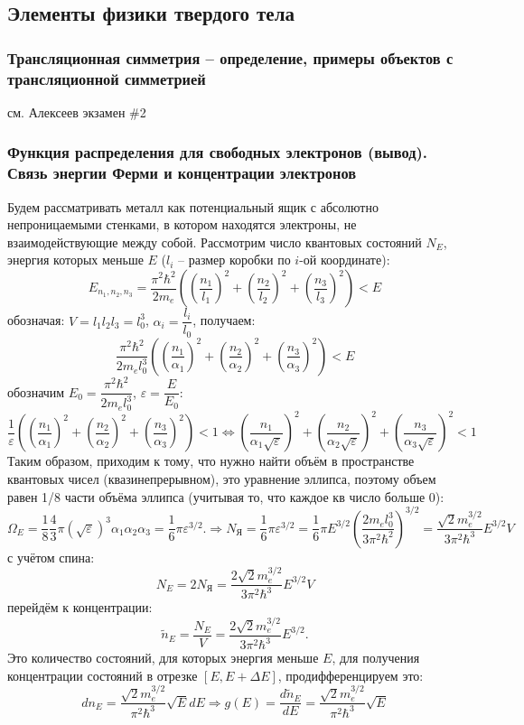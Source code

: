 \subsection{Элементы физики твердого тела}

\subsubsection{Трансляционная симметрия --  определение, примеры объектов с трансляционной симметрией}

см. Алексеев экзамен \#2

\subsubsection{Функция распределения для свободных электронов (вывод). Связь энергии Ферми и концентрации электронов}

Будем рассматривать металл как потенциальный ящик с абсолютно непроницаемыми стенками, в 
котором находятся электроны, не взаимодействующие между собой. Рассмотрим число квантовых состояний 
$N_E$, энергия которых меньше $E$ ($l_i$ -- размер коробки по $i$-ой координате):
\[
  E_{n_1, n_2, n_3} = \dfrac{\pi^2 \hbar^2}{2 m_e} \left(
    \left( \dfrac{n_1}{l_1} \right)^2 +
    \left( \dfrac{n_2}{l_2} \right)^2 +
    \left( \dfrac{n_3}{l_3} \right)^2 \right) < E
\]
обозначая: $V = l_1 l_2 l_3 = l_0^3$, $\alpha_i = \dfrac{l_i}{l_0}$, получаем:
\[
  \dfrac{\pi^2 \hbar^2}{2 m_e l_0^3} \left(
    \left( \dfrac{n_1}{\alpha_1} \right)^2 +
    \left( \dfrac{n_2}{\alpha_2} \right)^2 +
    \left( \dfrac{n_3}{\alpha_3} \right)^2 \right) < E
\]
обозначим $E_0 = \dfrac{\pi^2 \hbar^2}{2 m_e l_0^3}$, $\varepsilon = \dfrac{E}{E_0}$:
\[
  \dfrac{1}{\varepsilon} \left(
    \left( \dfrac{n_1}{\alpha_1} \right)^2 +
    \left( \dfrac{n_2}{\alpha_2} \right)^2 +
    \left( \dfrac{n_3}{\alpha_3} \right)^2\right) < 1
  \Leftrightarrow
  \left( \dfrac{n_1}{\alpha_1 \sqrt{\varepsilon}} \right)^2 +
    \left( \dfrac{n_2}{\alpha_2 \sqrt{\varepsilon}} \right)^2 +
    \left( \dfrac{n_3}{\alpha_3 \sqrt{\varepsilon}} \right)^2 < 1
\]
Таким образом, приходим к тому, что нужно найти объём в пространстве квантовых чисел
(квазинепрерывном), это уравнение эллипса, поэтому объем равен 1/8 части объёма эллипса
(учитывая то, что каждое кв число больше 0):
\[
  \Omega_E = \dfrac{1}{8} \dfrac{4}{3} \pi (\sqrt{\varepsilon})^3 \alpha_1 \alpha_2 \alpha_3
  = \dfrac{1}{6} \pi \varepsilon^{3/2}.
  \Rightarrow
  N_\text{Я} = \dfrac{1}{6} \pi \varepsilon^{3/2}
  = \dfrac{1}{6} \pi E^{3/2} \left( \dfrac{2 m_e l_0^3}{3 \pi^2 \hbar^2} \right)^{3/2}
  = \dfrac{\sqrt{2} m_e^{3/2}}{3 \pi^2 \hbar^3} E^{3/2} V
\]
с учётом спина:
\[
  N_E = 2 N_\text{Я} = \dfrac{2 \sqrt{2} m_e^{3/2}}{3 \pi^2 \hbar^3} E^{3/2} V 
\]
перейдём к концентрации:
\[
  \tilde n_E = \dfrac{N_E}{V} = \dfrac{2 \sqrt{2} m_e^{3/2}}{3 \pi^2 \hbar^3} E^{3/2}.
\]
Это количество состояний, для которых энергия меньше $E$, для получения концентрации состояний в
отрезке $[E, E+\Delta E]$, продифференцируем это:
\[
  dn_E = \dfrac{\sqrt{2} m_e^{3/2}}{\pi^2 \hbar^3} \sqrt{E} dE
  \Rightarrow
  g(E) = \dfrac{d\tilde n_E}{dE} = \dfrac{\sqrt{2} m_e^{3/2}}{\pi^2 \hbar^3} \sqrt{E}
\]

